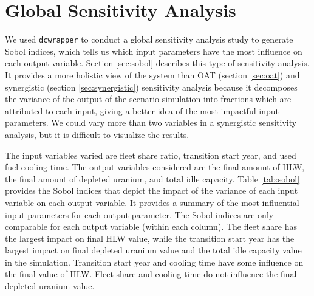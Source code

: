 \section{Global Sensitivity Analysis}
We used \texttt{dcwrapper} to conduct a global sensitivity 
analysis study to generate Sobol indices, which tells us which 
input parameters have the most influence on each output variable.
Section \ref{sec:sobol} describes this type of sensitivity 
analysis.
It provides a more holistic view of the system 
than OAT (section \ref{sec:oat}) and 
synergistic (section \ref{sec:synergistic}) sensitivity 
analysis because it decomposes the variance of the 
output of the scenario simulation into fractions which are 
attributed to each input, giving a better idea of the
most impactful input parameters. 
We could vary more than two variables in a synergistic 
sensitivity analysis, but it is difficult to visualize the results.

The input variables varied are fleet share ratio, 
transition start year, and used fuel cooling time.
The output variables considered are the final amount of HLW, 
the final amount of depleted uranium, and total idle capacity. 
Table \ref{tab:sobol} provides the Sobol indices that depict 
the impact of the variance of each input variable on each output 
variable. 
It provides a summary of the most influential input parameters 
for each output parameter. 
The Sobol indices are only comparable for each output variable 
(within each column). 
The fleet share has the largest impact on 
final HLW value, while the transition start year has the largest 
impact on final depleted uranium value and the total idle 
capacity value in the simulation. 
Transition start year and cooling time have some influence on 
the final value of HLW. 
Fleet share and cooling time do not influence the final 
depleted uranium value. 
    
